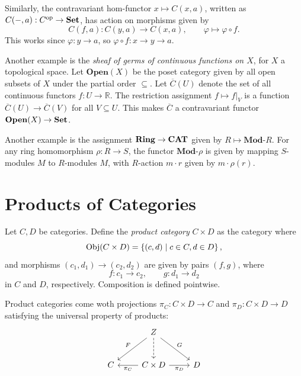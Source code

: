 Similarly, the contravariant hom-functor $x\mapsto C(x,a)$, written as $C(-,a): C^{\mathrm{op} }  \to \mathbf{Set} $, has action on morphisms given by
\[
	C(f,a): C(y,a) \to C(x,a),\qquad \varphi \mapsto \varphi \circ f
.\]
This works since $\varphi : y \to a$, so $\varphi \circ f : x \to y \to a$.

Another example is the \emph{sheaf of germs of continuous functions on $X$}, for $X$ a topological space. Let $\mathbf{Open} (X)$ be the poset category given by all open subsets of $X$ under the partial order $\subseteq $. Let $\overline{C} (U)$ denote the set of all continuous functors $f : U \to \mathbb{R} $. The restriction assignment $f\mapsto f|_V$ is a function $\overline{C} (U)\to \overline{C} (V)$ for all $V\subseteq U$. This makes $\overline{C} $ a contravariant functor $\mathbf{Open} (X)\to \mathbf{Set} $.

Another example is the assignment $\mathbf{Ring} \to \mathbf{CAT}$ given by $R\mapsto \mathbf{Mod} $-$R$. For any ring homomorphism $\rho : R \to S$, the functor $\mathbf{Mod} $-$\rho $ is given by mapping $S$-modules $M$ to $R$-modules $M$, with $R$-action $m\cdot r$ given by $m\cdot \rho (r)$.

\section{Products of Categories}

\begin{definition}\label{dfn:2.1}
	Let $C,D$ be categories. Define the \emph{product category} $C\times D$ as the category where
	\[
		\operatorname{Obj}(C\times D) =\left\{ (c,d)\mid c\in C,d\in D \right\} ,
	\]
	and morphisms $(c_1,d_1)\to (c_2,d_2)$ are given by pairs $(f,g)$, where
	\[
		f : c_1 \to c_2,\qquad g : d_1 \to d_2
	\]
	in $C$ and $D$, respectively. Composition is defined pointwise.
\end{definition}

Product categories come woth projections $\pi_C : C\times D \to C$ and $\pi _D : C\times D \to D$ satisfying the universal property of products:
\[\begin{tikzcd}[row sep = 2.5em, column sep = 2.5em]
 & Z\ar[" F "', dl] \ar[" G ", dr]  \ar[dashed, d]&  \\
C & C\times D\ar[" \pi _C ", l] \ar[" \pi _D "', r]  & D
\end{tikzcd}\]

